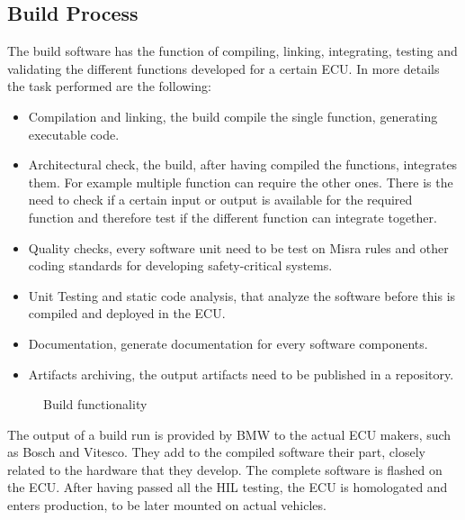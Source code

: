 \documentclass[../main.tex]{subfiles}
\begin{document}
\subsection{Build Process}
\label{subsection:Build process}
The build software has the function of compiling, linking, integrating, testing and validating the different functions developed for a certain \gls{ECU}. In more details the task performed are the following:
\begin{itemize}
    \item Compilation and linking, the build compile the single function, generating executable code. 
    \item Architectural check, the build, after having compiled the functions, integrates them. For example multiple function can require the other ones. There is the need to check if a certain input or output is available for the required function and therefore test if the different function can integrate together.
    \item Quality checks, every software unit need to be test on Misra rules and other coding standards for developing safety-critical systems.
    \item Unit Testing and static code analysis, that analyze the software before this is compiled and deployed in the \gls{ECU}.
    \item Documentation, generate documentation for every software components. 
    \item Artifacts archiving, the output artifacts need to be published in a repository.
\end{itemize}
\begin{figure}[H]
    \centering
    \caption{Build functionality}
    \label{fig:buildfucntionality}
\end{figure}
The output of a build run is provided by \gls{BMW} to the actual \gls{ECU} makers, such as Bosch and Vitesco. They add to the compiled software their part, closely related to the hardware that they develop. The complete software is flashed on the \gls{ECU}. After having passed all the HIL testing, the \gls{ECU} is homologated and enters production, to be later mounted on actual vehicles.
\end{document}
